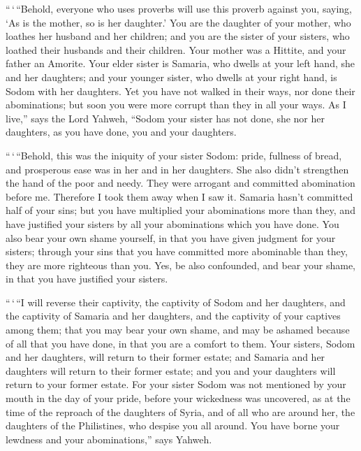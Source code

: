  ``\,`\,``Behold, everyone who uses proverbs will use
this proverb against you, saying, `As is the mother, so is her
daughter.'  You are the daughter of your mother, who
loathes her husband and her children; and you are the sister of your
sisters, who loathed their husbands and their children. Your mother was
a Hittite, and your father an Amorite.  Your elder sister
is Samaria, who dwells at your left hand, she and her daughters; and
your younger sister, who dwells at your right hand, is Sodom with her
daughters.  Yet you have not walked in their ways, nor
done their abominations; but soon you were more corrupt than they in all
your ways.  As I live,'' says the Lord Yahweh, ``Sodom
your sister has not done, she nor her daughters, as you have done, you
and your daughters.

 ``\,`\,``Behold, this was the iniquity of your sister
Sodom: pride, fullness of bread, and prosperous ease was in her and in
her daughters. She also didn't strengthen the hand of the poor and
needy.  They were arrogant and committed abomination
before me. Therefore I took them away when I saw it. 
Samaria hasn't committed half of your sins; but you have multiplied your
abominations more than they, and have justified your sisters by all your
abominations which you have done.  You also bear your own
shame yourself, in that you have given judgment for your sisters;
through your sins that you have committed more abominable than they,
they are more righteous than you. Yes, be also confounded, and bear your
shame, in that you have justified your sisters.

 ``\,`\,``I will reverse their captivity, the captivity
of Sodom and her daughters, and the captivity of Samaria and her
daughters, and the captivity of your captives among them;
 that you may bear your own shame, and may be ashamed
because of all that you have done, in that you are a comfort to them.
 Your sisters, Sodom and her daughters, will return to
their former estate; and Samaria and her daughters will return to their
former estate; and you and your daughters will return to your former
estate.  For your sister Sodom was not mentioned by your
mouth in the day of your pride,  before your wickedness
was uncovered, as at the time of the reproach of the daughters of Syria,
and of all who are around her, the daughters of the Philistines, who
despise you all around.  You have borne your lewdness and
your abominations,'' says Yahweh.

